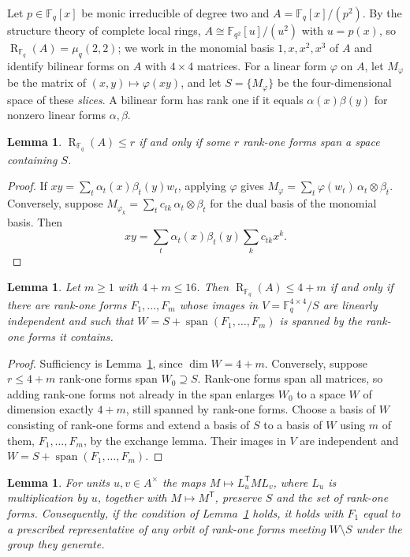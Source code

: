 \documentclass[11pt]{amsart}
\newtheorem{lemma}[theorem]{Lemma}
\theoremstyle{definition}
\theoremstyle{remark}
\newcommand{\F}{\mathbb F}
\newcommand{\R}{\operatorname{R}}
\newcommand{\spn}{\operatorname{span}}
\begin{document}
Let $p\in\F_q[x]$ be monic irreducible of degree two and $A=\F_q[x]/(p^2)$. By the structure theory of complete local rings, $A\cong\F_{q^2}[u]/(u^2)$ with $u=p(x)$, so $\R_{\F_q}(A)=\mu_q(2,2)$; we work in the monomial basis $1,x,x^2,x^3$ of $A$ and identify bilinear forms on $A$ with $4\times4$ matrices. For a linear form $\varphi$ on $A$, let $M_\varphi$ be the matrix of $(x,y)\mapsto\varphi(xy)$, and let $S=\{M_\varphi\}$ be the four-dimensional space of these \emph{slices}. A bilinear form has rank one if it equals $\alpha(x)\beta(y)$ for nonzero linear forms $\alpha,\beta$.

\begin{lemma}\label{lem:slices}
$\R_{\F_q}(A)\le r$ if and only if some $r$ rank-one forms span a space containing $S$.
\end{lemma}

\begin{proof}
If $xy=\sum_t\alpha_t(x)\beta_t(y)w_t$, applying $\varphi$ gives $M_\varphi=\sum_t\varphi(w_t)\,\alpha_t\otimes\beta_t$. Conversely, suppose $M_{\varphi_k}=\sum_t c_{tk}\,\alpha_t\otimes\beta_t$ for the dual basis of the monomial basis. Then
\[
xy=\sum_t\alpha_t(x)\beta_t(y)\sum_k c_{tk}x^k.
\]
\end{proof}

\begin{lemma}\label{lem:normal}
Let $m\ge1$ with $4+m\le16$. Then $\R_{\F_q}(A)\le 4+m$ if and only if there are rank-one forms $F_1,\dots,F_m$ whose images in $V=\F_q^{4\times4}/S$ are linearly independent and such that $W=S+\spn(F_1,\dots,F_m)$ is spanned by the rank-one forms it contains.
\end{lemma}

\begin{proof}
Sufficiency is Lemma~\ref{lem:slices}, since $\dim W=4+m$. Conversely, suppose $r\le4+m$ rank-one forms span $W_0\supseteq S$. Rank-one forms span all matrices, so adding rank-one forms not already in the span enlarges $W_0$ to a space $W$ of dimension exactly $4+m$, still spanned by rank-one forms. Choose a basis of $W$ consisting of rank-one forms and extend a basis of $S$ to a basis of $W$ using $m$ of them, $F_1,\dots,F_m$, by the exchange lemma. Their images in $V$ are independent and $W=S+\spn(F_1,\dots,F_m)$.
\end{proof}

\begin{lemma}\label{lem:sym}
For units $u,v\in A^\times$ the maps $M\mapsto L_u^{\mathsf T}ML_v$, where $L_u$ is multiplication by $u$, together with $M\mapsto M^{\mathsf T}$, preserve $S$ and the set of rank-one forms. Consequently, if the condition of Lemma~\ref{lem:normal} holds, it holds with $F_1$ equal to a prescribed representative of any orbit of rank-one forms meeting $W\setminus S$ under the group they generate.
\end{lemma}
\end{document}
